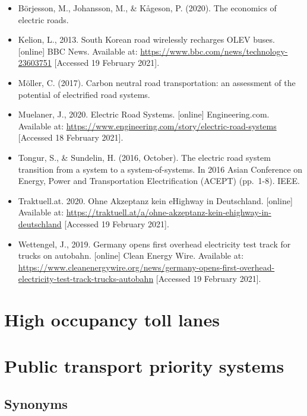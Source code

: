 \documentclass[
]{book}
\providecommand{\tightlist}{%
  \setlength{\itemsep}{0pt}\setlength{\parskip}{0pt}}
\begin{document}
\begin{itemize}
\tightlist
\item
  Börjesson, M., Johansson, M., \& Kågeson, P. (2020). The economics of electric roads.
\item
  Kelion, L., 2013. South Korean road wirelessly recharges OLEV buses. {[}online{]} BBC News. Available at: \url{https://www.bbc.com/news/technology-23603751} {[}Accessed 19 February 2021{]}.
\item
  Möller, C. (2017). Carbon neutral road transportation: an assessment of the potential of electrified road systems.
\item
  Muelaner, J., 2020. Electric Road Systems. {[}online{]} Engineering.com. Available at: \url{https://www.engineering.com/story/electric-road-systems} {[}Accessed 18 February 2021{]}.
\item
  Tongur, S., \& Sundelin, H. (2016, October). The electric road system transition from a system to a system-of-systems. In 2016 Asian Conference on Energy, Power and Transportation Electrification (ACEPT) (pp.~1-8). IEEE.
\item
  Traktuell.at. 2020. Ohne Akzeptanz kein eHighway in Deutschland. {[}online{]} Available at: \url{https://traktuell.at/a/ohne-akzeptanz-kein-ehighway-in-deutschland} {[}Accessed 19 February 2021{]}.
\item
  Wettengel, J., 2019. Germany opens first overhead electricity test track for trucks on autobahn. {[}online{]} Clean Energy Wire. Available at: \url{https://www.cleanenergywire.org/news/germany-opens-first-overhead-electricity-test-track-trucks-autobahn} {[}Accessed 19 February 2021{]}.
\end{itemize}

\hypertarget{high_occupancy}{%
\section{High occupancy toll lanes}\label{high_occupancy}}

\hypertarget{public_trans_priority}{%
\section{Public transport priority systems}\label{public_trans_priority}}

\hypertarget{synonyms-2}{%
\subsection*{Synonyms}\label{synonyms-2}}
\end{document}
